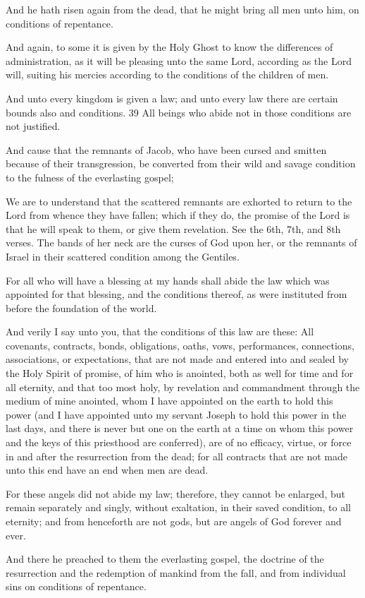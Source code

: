 		\begin{compactdesc}
			\item[DC 18:12] And he hath risen again from the dead, that he might bring all men unto him, on conditions of repentance.
			\item[DC 46:15] And again, to some it is given by the Holy Ghost to know the differences of administration, as it will be pleasing unto the same Lord, according as the Lord will, suiting his mercies according to the conditions of the children of men.
			\item[DC 88:38--39] And unto every kingdom is given a law; and unto every law there are certain bounds also and conditions. 39 All beings who abide not in those conditions are not justified.
			\item[DC 109:65] And cause that the remnants of Jacob, who have been cursed and smitten because of their transgression, be converted from their wild and savage condition to the fulness of the everlasting gospel;
			\item[DC 113:10] We are to understand that the scattered remnants are exhorted to return to the Lord from whence they have fallen; which if they do, the promise of the Lord is that he will speak to them, or give them revelation.  See the 6th, 7th, and 8th verses.  The bands of her neck are the curses of God upon her, or the remnants of Israel in their scattered condition among the Gentiles.
			\item[DC 132:5] For all who will have a blessing at my hands shall abide the law which was appointed for that blessing, and the conditions thereof, as were instituted from before the foundation of the world.
			\item[DC 132:7] And verily I say unto you, that the conditions of this law are these: All covenants, contracts, bonds, obligations, oaths, vows, performances, connections, associations, or expectations, that are not made and entered into and sealed by the Holy Spirit of promise, of him who is anointed, both as well for time and for all eternity, and that too most holy, by revelation and commandment through the medium of mine anointed, whom I have appointed on the earth to hold this power (and I have appointed unto my servant Joseph to hold this power in the last days, and there is never but one on the earth at a time on whom this power and the keys of this priesthood are conferred), are of no efficacy, virtue, or force in and after the resurrection from the dead; for all contracts that are not made unto this end have an end when men are dead.
			\item[DC 132:17] For these angels did not abide my law; therefore, they cannot be enlarged, but remain separately and singly, without exaltation, in their saved condition, to all eternity; and from henceforth are not gods, but are angels of God forever and ever.
			\item[DC 138:19] And there he preached to them the everlasting gospel, the doctrine of the resurrection and the redemption of mankind from the fall, and from individual sins on conditions of repentance.
			\item[DC OD1:16] 
		\end{compactdesc}
		

